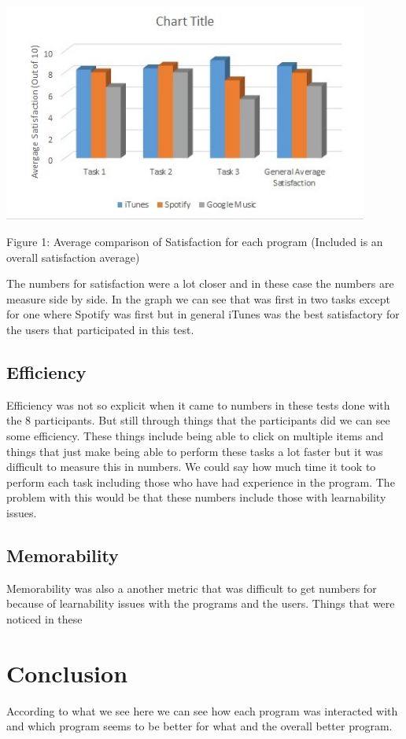 \documentclass{article}
\begin{document}
\begin{center}
\includegraphics[width=120mm]{Satisfaction.jpg}
\end{center}
\begin{center}
Figure 1: Average comparison of Satisfaction for each program (Included is an overall satisfaction average)
\end{center}

The numbers for satisfaction were a lot closer and in these case the numbers are measure side by side. In the graph we can see that was first in two tasks except for one where Spotify was first but in general iTunes was the best satisfactory for the users that participated in this test.

\subsection{Efficiency}
Efficiency was not so explicit when it came to numbers in these tests done with the 8 participants. But still through things that the participants did we can see some efficiency. These things include being able to click on multiple items and things that just make being able to perform these tasks a lot faster but it was difficult to measure this in numbers. We could say how much time it took to perform each task including those who have had experience in the program. The problem with this would be that these numbers include those with learnability issues.

\subsection{Memorability}
Memorability was also a another metric that was difficult to get numbers for because of learnability issues with the programs and the users. Things that were noticed in these
\section{Conclusion}
According to what we see here we can see how each program was interacted with and which program seems to be better for what and the overall better program.
\end{document}
